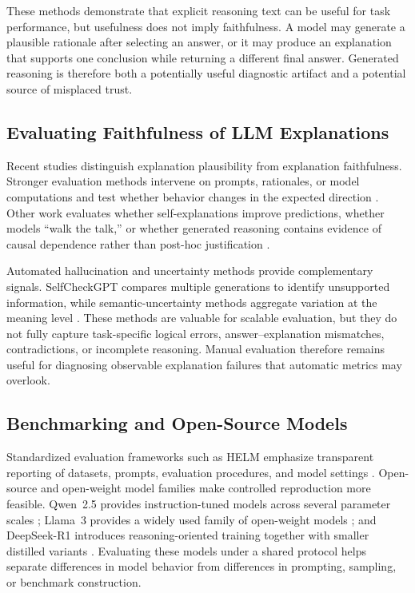\documentclass{article}
\begin{document}
These methods demonstrate that explicit reasoning text can be useful
for task performance, but usefulness does not imply faithfulness.
A model may generate a plausible rationale after selecting an answer,
or it may produce an explanation that supports one conclusion while
returning a different final answer. Generated reasoning is therefore
both a potentially useful diagnostic artifact and a potential source
of misplaced trust.

\subsection{Evaluating Faithfulness of LLM Explanations}

Recent studies distinguish explanation plausibility from explanation
faithfulness. Stronger evaluation methods intervene on prompts,
rationales, or model computations and test whether behavior changes in
the expected direction
\cite{turpin2023language,lanham2023measuring,zaman2025causal}.
Other work evaluates whether self-explanations improve predictions,
whether models ``walk the talk,'' or whether generated reasoning
contains evidence of causal dependence rather than post-hoc
justification
\cite{madsen2024selfexplanations,paul2024making,matton2025walk}.

Automated hallucination and uncertainty methods provide complementary
signals. SelfCheckGPT compares multiple generations to identify
unsupported information, while semantic-uncertainty methods aggregate
variation at the meaning level
\cite{manakul2023selfcheckgpt,farquhar2024semantic}. These methods are
valuable for scalable evaluation, but they do not fully capture
task-specific logical errors, answer--explanation mismatches,
contradictions, or incomplete reasoning. Manual evaluation therefore
remains useful for diagnosing observable explanation failures that
automatic metrics may overlook.

\subsection{Benchmarking and Open-Source Models}

Standardized evaluation frameworks such as HELM emphasize transparent
reporting of datasets, prompts, evaluation procedures, and model
settings \cite{liang2023helm}. Open-source and open-weight model
families make controlled reproduction more feasible. Qwen~2.5 provides
instruction-tuned models across several parameter scales
\cite{qwen2024qwen25}; Llama~3 provides a widely used family of
open-weight models \cite{grattafiori2024llama3}; and DeepSeek-R1
introduces reasoning-oriented training together with smaller distilled
variants \cite{deepseek2025r1}. Evaluating these models under a shared
protocol helps separate differences in model behavior from differences
in prompting, sampling, or benchmark construction.
\end{document}
